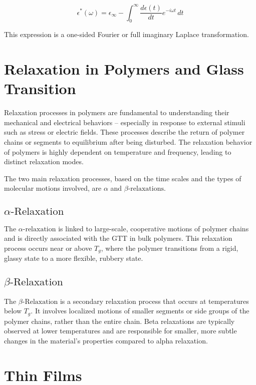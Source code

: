 \[
\epsilon^*(\omega) = \epsilon_\infty - \int_{0}^{\infty} \frac{d\epsilon(t)}{dt} e^{-i\omega t} \, dt
\]

This expression is a one-sided Fourier or full imaginary Laplace transformation.
\section{Relaxation in Polymers and Glass Transition}


Relaxation processes in polymers are fundamental to understanding their mechanical and electrical behaviors -- especially in response to external stimuli such as stress or electric fields. These processes describe the return of polymer chains or segments to equilibrium after being disturbed. The relaxation behavior of polymers is highly dependent on temperature and frequency, leading to distinct relaxation modes.

 The two main relaxation processes, based on the time scales and the types of molecular motions involved, are $\alpha$ and $\beta\text{-relaxations}$.

\subsection{$\alpha\text{-Relaxation}$}


The \(\alpha\text{-relaxation}\) is linked to large-scale, cooperative motions of polymer chains and is directly associated with the \ac{GTT} in bulk polymers. This relaxation process occurs near or above \(T_g\), where the polymer transitions from a rigid, glassy state to a more flexible, rubbery state. %
\subsection{$\beta\text{-Relaxation}$}

The $\beta\text{-Relaxation}$ is a secondary relaxation process that occurs at temperatures below \(T_g\). It involves localized motions of smaller segments or side groups of the polymer chains, rather than the entire chain. Beta relaxations are typically observed at lower temperatures and are responsible for smaller, more subtle changes in the material's properties compared to alpha relaxation.

\section{Thin Films}
